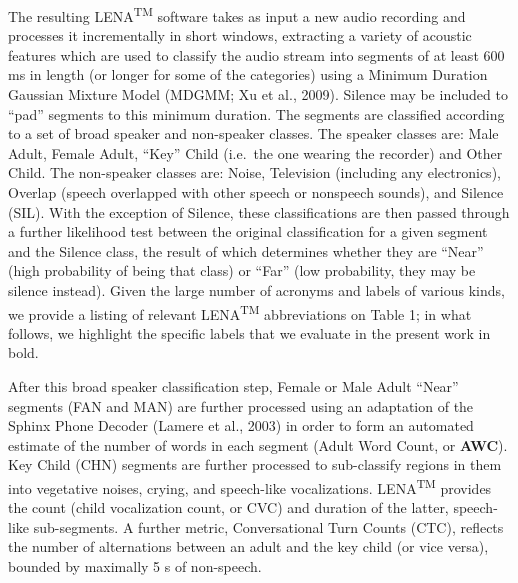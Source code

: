 \documentclass[english,table,man,floatsintext]{apa6}
\begin{document}
The resulting LENA\textsuperscript{TM} software takes as input a new audio recording and processes it incrementally in short windows, extracting a variety of acoustic features which are used to classify the audio stream into segments of at least 600 ms in length (or longer for some of the categories) using a Minimum Duration Gaussian Mixture Model (MDGMM; Xu et al., 2009). Silence may be included to \enquote{pad} segments to this minimum duration. The segments are classified according to a set of broad speaker and non-speaker classes. The speaker classes are: Male Adult, Female Adult, \enquote{Key} Child (i.e.~the one wearing the recorder) and Other Child. The non-speaker classes are: Noise, Television (including any electronics), Overlap (speech overlapped with other speech or nonspeech sounds), and Silence (SIL). With the exception of Silence, these classifications are then passed through a further likelihood test between the original classification for a given segment and the Silence class, the result of which determines whether they are \enquote{Near} (high probability of being that class) or \enquote{Far} (low probability, they may be silence instead). Given the large number of acronyms and labels of various kinds, we provide a listing of relevant LENA\textsuperscript{TM} abbreviations on Table 1; in what follows, we highlight the specific labels that we evaluate in the present work in bold.

After this broad speaker classification step, Female or Male Adult \enquote{Near} segments (FAN and MAN) are further processed using an adaptation of the Sphinx Phone Decoder (Lamere et al., 2003) in order to form an automated estimate of the number of words in each segment (Adult Word Count, or \textbf{AWC}). Key Child (CHN) segments are further processed to sub-classify regions in them into vegetative noises, crying, and speech-like vocalizations. LENA\textsuperscript{TM} provides the count (child vocalization count, or CVC) and duration of the latter, speech-like sub-segments. A further metric, Conversational Turn Counts (CTC), reflects the number of alternations between an adult and the key child (or vice versa), bounded by maximally 5 s of non-speech.
\end{document}
